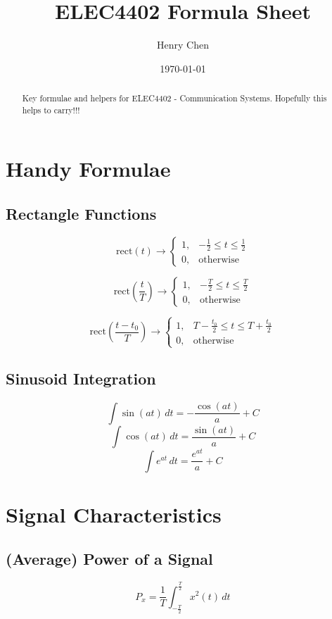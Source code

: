 \documentclass[10pt]{article}
\title{ELEC4402 Formula Sheet}
\author{Henry Chen}
\date{\today}
\begin{document}
\maketitle

\begin{abstract}
    Key formulae and helpers for ELEC4402 - Communication Systems. Hopefully this helps to carry!!!
\end{abstract}

\tableofcontents
\newpage

\section{Handy Formulae}
\subsection{Rectangle Functions}
\[
	\text{rect}(t) \rightarrow
	\begin{cases}
		1, & -\frac{1}{2} \leq t \leq \frac{1}{2} \\
		0, & \text{otherwise}
	\end{cases}
\]

\[
	\text{rect}\left(\frac{t}{T}\right) \rightarrow
	\begin{cases}
		1, & -\frac{T}{2} \leq t \leq \frac{T}{2} \\
		0, & \text{otherwise}
	\end{cases}
\]

\[
	\text{rect}\left(\frac{t - t_0}{T}\right) \rightarrow
	\begin{cases}
		1, & T - \frac{t_0}{2} \leq t \leq T + \frac{t_0}{2} \\
		0, & \text{otherwise}
	\end{cases}
\]

\subsection{Sinusoid Integration}
\[
	\int \sin(at) \, dt = -\frac{\cos(at)}{a} + C
\]
\[
	\int \cos(at) \, dt = \frac{\sin(at)}{a} + C
\]
\[
	\int e^{at} \, dt = \frac{e^{at}}{a} + C
\]

\section{Signal Characteristics}
\subsection{(Average) Power of a Signal}
$$
	P_x = \frac{1}{T} \int_{-\frac{T}{2}}^{\frac{T}{2}} x^2(t) \, dt
$$
\end{document}
